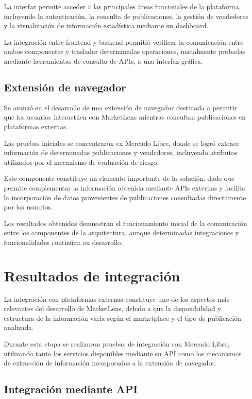 La interfaz permite acceder a las principales áreas funcionales de la
plataforma, incluyendo la autenticación, la consulta de publicaciones,
la gestión de vendedores y la visualización de información estadística
mediante un dashboard.

La integración entre frontend y backend permitió verificar la
comunicación entre ambos componentes y trasladar determinadas
operaciones, inicialmente probadas mediante herramientas de consulta de
APIs, a una interfaz gráfica.

\subsection{Extensión de navegador}

Se avanzó en el desarrollo de una extensión de navegador destinada a
permitir que los usuarios interactúen con MarketLens mientras consultan
publicaciones en plataformas externas.

Las pruebas iniciales se concentraron en Mercado Libre, donde se logró
extraer información de determinadas publicaciones y vendedores,
incluyendo atributos utilizados por el mecanismo de evaluación de
riesgo.

Este componente constituye un elemento importante de la solución, dado
que permite complementar la información obtenida mediante APIs externas
y facilita la incorporación de datos provenientes de publicaciones
consultadas directamente por los usuarios.

Los resultados obtenidos demuestran el funcionamiento inicial de la
comunicación entre los componentes de la arquitectura, aunque
determinadas integraciones y funcionalidades continúan en desarrollo.

\section{Resultados de integración}

La integración con plataformas externas constituye uno de los aspectos
más relevantes del desarrollo de MarketLens, debido a que la
disponibilidad y estructura de la información varía según el marketplace
y el tipo de publicación analizada.

Durante esta etapa se realizaron pruebas de integración con Mercado
Libre, utilizando tanto los servicios disponibles mediante su API como
los mecanismos de extracción de información incorporados a la extensión
de navegador.

\subsection{Integración mediante API}

